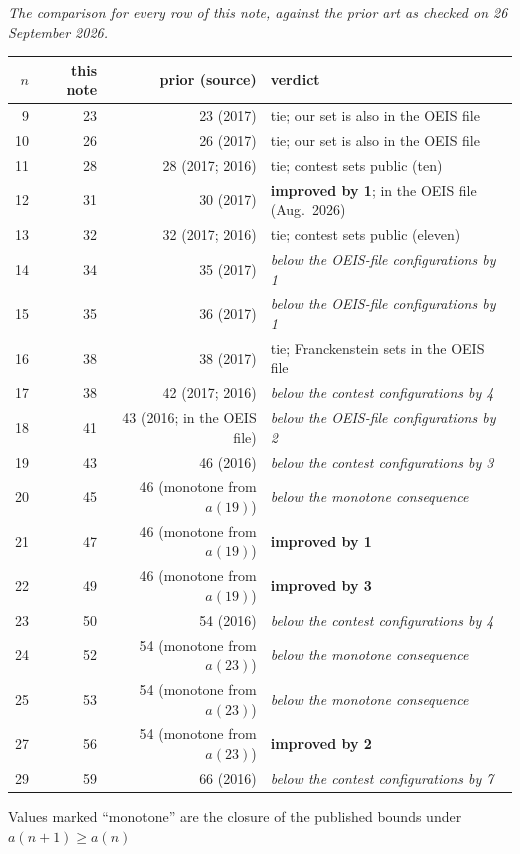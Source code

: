 \documentclass[11pt,a4paper]{article}
\begin{document}
\emph{The comparison for every row of this note, against the prior art as checked on 26 September 2026.}
\begin{center}\small
\begin{tabular}{rrrl}
\toprule
$n$ & this note & prior (source) & verdict\\
\midrule
 9 & 23 & 23 (2017) & tie; our set is also in the OEIS file\\
10 & 26 & 26 (2017) & tie; our set is also in the OEIS file\\
11 & 28 & 28 (2017; 2016) & tie; contest sets public (ten)\\
12 & 31 & 30 (2017) & \textbf{improved by 1}; in the OEIS file (Aug.\ 2026)\\
13 & 32 & 32 (2017; 2016) & tie; contest sets public (eleven)\\
14 & 34 & 35 (2017) & \emph{below the OEIS-file configurations by 1}\\
15 & 35 & 36 (2017) & \emph{below the OEIS-file configurations by 1}\\
16 & 38 & 38 (2017) & tie; Franckenstein sets in the OEIS file\\
17 & 38 & 42 (2017; 2016) & \emph{below the contest configurations by 4}\\
18 & 41 & 43 (2016; in the OEIS file) & \emph{below the OEIS-file configurations by 2}\\
19 & 43 & 46 (2016) & \emph{below the contest configurations by 3}\\
20 & 45 & 46 (monotone from $a(19)$) & \emph{below the monotone consequence}\\
21 & 47 & 46 (monotone from $a(19)$) & \textbf{improved by 1}\\
22 & 49 & 46 (monotone from $a(19)$) & \textbf{improved by 3}\\
23 & 50 & 54 (2016) & \emph{below the contest configurations by 4}\\
24 & 52 & 54 (monotone from $a(23)$) & \emph{below the monotone consequence}\\
25 & 53 & 54 (monotone from $a(23)$) & \emph{below the monotone consequence}\\
27 & 56 & 54 (monotone from $a(23)$) & \textbf{improved by 2}\\
29 & 59 & 66 (2016) & \emph{below the contest configurations by 7}\\
\bottomrule
\end{tabular}
\end{center}
Values marked ``monotone'' are the closure of the published bounds under $a(n+1)\ge a(n)$
\end{document}
